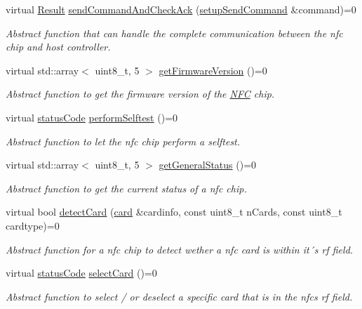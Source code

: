 \begin{DoxyCompactItemize}
virtual \hyperlink{structnfc_1_1Result}{Result} \hyperlink{classnfc_1_1NFC_a2a14e65f49707ef1efaea07ec9fce1c8}{send\+Command\+And\+Check\+Ack} (\hyperlink{classsetupSendCommand}{setup\+Send\+Command} \&command)=0
\begin{DoxyCompactList}\small\item\em Abstract function that can handle the complete communication between the nfc chip and host controller. \end{DoxyCompactList}\item 
virtual std\+::array$<$ uint8\+\_\+t, 5 $>$ \hyperlink{classnfc_1_1NFC_a25a4f9824ac567c8ca37ea3486d32882}{get\+Firmware\+Version} ()=0
\begin{DoxyCompactList}\small\item\em Abstract function to get the firmware version of the \hyperlink{classnfc_1_1NFC}{N\+FC} chip. \end{DoxyCompactList}\item 
virtual \hyperlink{declarations_8h_ae1d20c5a38cae82ccaa6a77be3fd264b}{status\+Code} \hyperlink{classnfc_1_1NFC_ac23474442d2bc8e35ee583c1390386eb}{perform\+Selftest} ()=0
\begin{DoxyCompactList}\small\item\em Abstract function to let the nfc chip perform a selftest. \end{DoxyCompactList}\item 
virtual std\+::array$<$ uint8\+\_\+t, 5 $>$ \hyperlink{classnfc_1_1NFC_a4ee83726542bf5f25eacb9feaccefd28}{get\+General\+Status} ()=0
\begin{DoxyCompactList}\small\item\em Abstract function to get the current status of a nfc chip. \end{DoxyCompactList}\item 
virtual bool \hyperlink{classnfc_1_1NFC_a72523a6c0afdb3f695a64e46fd6d2213}{detect\+Card} (\hyperlink{classcard}{card} \&cardinfo, const uint8\+\_\+t n\+Cards, const uint8\+\_\+t cardtype)=0
\begin{DoxyCompactList}\small\item\em Abstract function for a nfc chip to detect wether a nfc card is within it´s rf field. \end{DoxyCompactList}\item 
virtual \hyperlink{declarations_8h_ae1d20c5a38cae82ccaa6a77be3fd264b}{status\+Code} \hyperlink{classnfc_1_1NFC_a89a1275bc915581d708c65d487427317}{select\+Card} ()=0
\begin{DoxyCompactList}\small\item\em Abstract function to select / or deselect a specific card that is in the nfc\textquotesingle{}s rf field. \end{DoxyCompactList}\item 

\end{DoxyCompactItemize}
